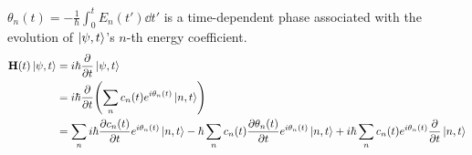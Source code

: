 \documentclass[12pt,a4paper,titlepage]{article}
\begin{document}
$\theta_{n}(t)=-\frac{1}{\hbar}\int_{0}^{t}E_{n}(t')\dd{t'}$ is a time-dependent phase associated with the evolution of $\ket{\psi,t}$'s $n$-th energy coefficient.
\begin{equation}
\begin{aligned}
\vb{H}(t)\ket{\psi,t}&=i\hbar\pdv{t}\ket{\psi,t}\\
&=i\hbar\pdv{t}\qty(\sum_{n}c_{n}(t)e^{i\theta_{n}(t)}\ket{n,t})\\
&=\sum_{n}i\hbar\pdv{c_{n}(t)}{t}e^{i\theta_{n}(t)}\ket{n,t}-\hbar\sum_{n}c_{n}(t)\pdv{\theta_{n}(t)}{t}e^{i\theta_{n}(t)}\ket{n,t}+i\hbar\sum_{n}c_{n}(t)e^{i\theta_{n}(t)}\pdv{t}\ket{n,t}\\
\end{aligned}
\end{equation}
\end{document}
